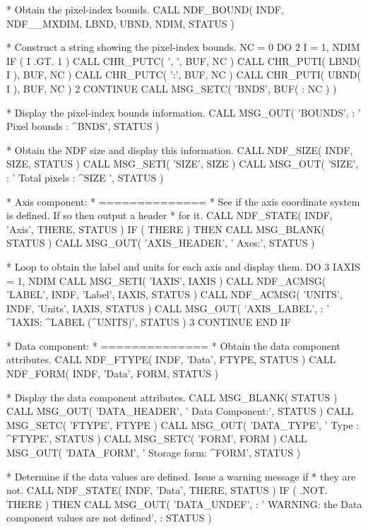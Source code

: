\documentclass[twoside,11pt,nolof]{starlink}
\begin{document}
\begin{terminalv}
*  Obtain the pixel-index bounds.
      CALL NDF_BOUND( INDF, NDF__MXDIM, LBND, UBND, NDIM, STATUS )

*  Construct a string showing the pixel-index bounds.
      NC = 0
       DO 2 I = 1, NDIM
         IF ( I .GT. 1 ) CALL CHR_PUTC( ', ', BUF, NC )
         CALL CHR_PUTI( LBND( I ), BUF, NC )
         CALL CHR_PUTC( ':', BUF, NC )
         CALL CHR_PUTI( UBND( I ), BUF, NC )
 2    CONTINUE
      CALL MSG_SETC( 'BNDS', BUF( : NC ) )

*  Display the pixel-index bounds information.
      CALL MSG_OUT( 'BOUNDS',
     : '      Pixel bounds     :  ^BNDS', STATUS )

*  Obtain the NDF size and display this information.
      CALL NDF_SIZE( INDF, SIZE, STATUS )
      CALL MSG_SETI( 'SIZE', SIZE )
      CALL MSG_OUT( 'SIZE',
     : '      Total pixels     :  ^SIZE ', STATUS )

*  Axis component:
*  ==============
*  See if the axis coordinate system is defined. If so then output a header
*  for it.
      CALL NDF_STATE( INDF, 'Axis', THERE, STATUS )
      IF ( THERE ) THEN
         CALL MSG_BLANK( STATUS )
         CALL MSG_OUT( 'AXIS_HEADER', '   Axes:', STATUS )

*  Loop to obtain the label and units for each axis and display them.
         DO 3 IAXIS = 1, NDIM
            CALL MSG_SETI( 'IAXIS', IAXIS )
            CALL NDF_ACMSG( 'LABEL', INDF, 'Label', IAXIS, STATUS )
            CALL NDF_ACMSG( 'UNITS', INDF, 'Units', IAXIS, STATUS )
            CALL MSG_OUT( 'AXIS_LABEL',
     :      '      ^IAXIS: ^LABEL (^UNITS)', STATUS )
 3       CONTINUE
      END IF

*  Data component:
*  ==============
*  Obtain the data component attributes.
      CALL NDF_FTYPE( INDF, 'Data', FTYPE, STATUS )
      CALL NDF_FORM( INDF, 'Data', FORM, STATUS )

*  Display the data component attributes.
      CALL MSG_BLANK( STATUS )
      CALL MSG_OUT( 'DATA_HEADER', '   Data Component:', STATUS )
      CALL MSG_SETC( 'FTYPE', FTYPE )
      CALL MSG_OUT( 'DATA_TYPE', '      Type        :  ^FTYPE', STATUS )
      CALL MSG_SETC( 'FORM', FORM )
      CALL MSG_OUT( 'DATA_FORM', '      Storage form:  ^FORM', STATUS )

*  Determine if the data values are defined. Issue a warning message if
*  they are not.
      CALL NDF_STATE( INDF, 'Data', THERE, STATUS )
      IF ( .NOT. THERE ) THEN
         CALL MSG_OUT( 'DATA_UNDEF',
     :   '      WARNING: the Data component values are not defined',
     :                 STATUS )


\end{terminalv}
\end{document}
